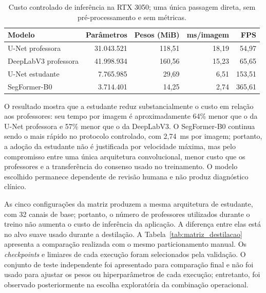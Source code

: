 \documentclass[12pt]{article}
\begin{document}
\begin{table}[!htbp]
\centering
\scriptsize
\caption[Custo controlado de inferência na RTX 3050]{Custo controlado de inferência na RTX 3050; uma única passagem direta, sem pré-processamento e sem métricas.}
\label{tab:tempo_destilado}
\begin{tabular}{lrrrr}
\toprule
\textbf{Modelo} & \textbf{Parâmetros} & \textbf{Pesos (MiB)} & \textbf{ms/imagem} & \textbf{FPS} \\
\midrule
U-Net professora & 31.043.521 & 118,51 & 18,19 & 54,97 \\
DeepLabV3 professora & 41.998.934 & 160,56 & 15,23 & 65,65 \\
U-Net estudante & 7.765.985 & 29,69 & 6,51 & 153,51 \\
SegFormer-B0 & 3.714.401 & 14,25 & 2,74 & 365,61 \\
\bottomrule
\end{tabular}
\end{table}

O resultado mostra que a estudante reduz substancialmente o custo em relação
aos professores: seu tempo por imagem é aproximadamente 64\% menor que o da
U-Net professora e 57\% menor que o da DeepLabV3. O SegFormer-B0 continua sendo
o mais rápido no protocolo controlado, com 2,74~ms por imagem; portanto, a
adoção da estudante não é justificada por velocidade máxima, mas pelo
compromisso entre uma única arquitetura convolucional, menor custo que os
professores e a transferência do consenso usado no treinamento. O modelo
escolhido permanece dependente de revisão humana e não produz diagnóstico
clínico.

As cinco configurações da matriz produzem a mesma arquitetura de estudante,
com 32 canais de base; portanto, o número de professores utilizados durante o
treino não aumenta o custo de inferência da aplicação. A diferença entre elas
está no alvo suave usado durante a destilação. A Tabela~\ref{tab:matriz_destilacao}
apresenta a comparação realizada com o mesmo particionamento manual. Os
\textit{checkpoints} e limiares de cada execução foram selecionados pela
validação. O conjunto de teste independente foi apresentado para comparação
final e não foi usado para ajustar os pesos ou hiperparâmetros de cada
execução; entretanto, foi observado posteriormente na escolha exploratória da
combinação operacional.
\end{document}
